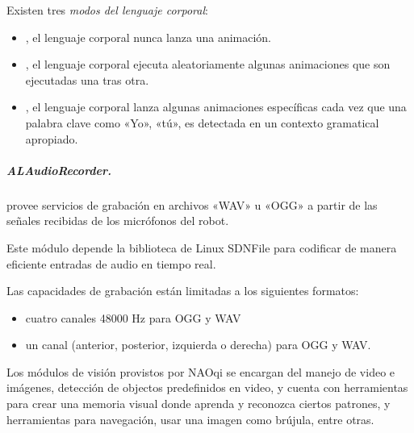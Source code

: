 \begin{sphinxVerbatim}[commandchars=\\\{\}]
\end{sphinxVerbatim}


Existen tres \textit{modos del lenguaje corporal}:
\begin{itemize}
\item {} 
, el lenguaje corporal nunca lanza una animación.

\item {} 
, el lenguaje corporal ejecuta aleatoriamente algunas animaciones que son ejecutadas una tras otra.

\item {} 
, el lenguaje corporal lanza algunas animaciones específicas cada vez que una palabra clave como «Yo», «tú», es detectada en un contexto gramatical apropiado.

\end{itemize}


\subparagraph{ALAudioRecorder.}
\label{\detokenize{chapter_one/naoqi:alaudiorecorder}}
 provee servicios de grabación en archivos «WAV»
u «OGG» a partir de las señales recibidas de los micrófonos del robot.

Este módulo depende la biblioteca de Linux SDNFile para
codificar de manera eficiente entradas de audio en tiempo real.

Las capacidades de grabación están limitadas a los siguientes
formatos:
\begin{itemize}
\item {} 
cuatro canales 48000 Hz para OGG y WAV

\item {} 
un canal (anterior, posterior, izquierda o derecha) para OGG y WAV.

\end{itemize}

Los módulos de visión provistos por NAOqi se encargan del manejo de video e
imágenes, detección de objectos predefinidos en video, y cuenta con herramientas
para crear una memoria visual donde aprenda y reconozca ciertos patrones,
y herramientas para navegación, usar una imagen como brújula, entre otras.


